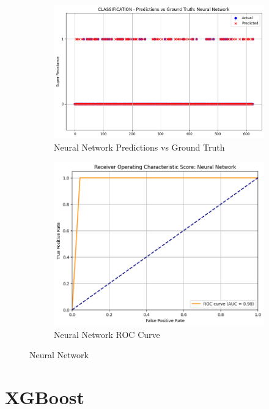 \documentclass[manuscript,screen,review, nonacm]{acmart}
\begin{document}
\begin{figure}[H]
    \centering
    \begin{subfigure}{0.45\textwidth}
        \includegraphics[width=\linewidth]{figs/nn1.png}
        \caption{Neural Network Predictions vs Ground Truth}
    \end{subfigure}
    \hfill
    \begin{subfigure}{0.45\textwidth}
        \includegraphics[width=\linewidth]{figs/nn2.png}
        \caption{Neural Network ROC Curve}
    \end{subfigure}
    \caption{Neural Network}
\end{figure}


\section*{XGBoost}
\end{document}

